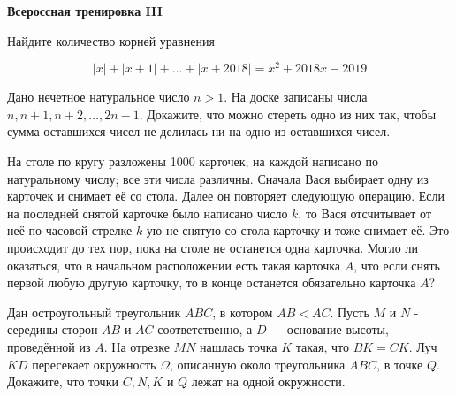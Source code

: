 \centerline{\bf \Huge Всероссная тренировка III}

\begin{flushright}
        \scriptsize{}
\end{flushright}

Найдите количество корней уравнения

$$
|x|+|x+1|+\ldots+|x+2018|=x^2+2018 x-2019
$$


Дано нечетное натуральное число $n>1$. На доске записаны числа $n, n+1, n+2, \ldots, 2 n-1$. Докажите, что можно стереть одно из них так, чтобы сумма оставшихся чисел не делилась ни на одно из оставшихся чисел.

На столе по кругу разложены 1000 карточек, на каждой написано по натуральному числу; все эти числа различны. Сначала Вася выбирает одну из карточек и снимает её со стола. Далее он повторяет следующую операцию. Если на последней снятой карточке было написано число $k$, то Вася отсчитывает от неё по часовой стрелке $k$-ую не снятую со стола карточку и тоже снимает её. Это происходит до тех пор, пока на столе не останется одна карточка. Могло ли оказаться, что в начальном расположении есть такая карточка $A$, что если снять первой любую другую карточку, то в конце останется обязательно карточка $A$?

Дан остроугольный треугольник $A B C$, в котором $A B<A C$. Пусть $M$ и $N$ - середины сторон $A B$ и $A C$ соответственно, а $D$ --- основание высоты, проведённой из $A$. На отрезке $M N$ нашлась точка $K$ такая, что $B K=C K$. Луч $K D$ пересекает окружность $\Omega$, описанную около треугольника $A B C$, в точке $Q$. Докажите, что точки $C, N, K$ и $Q$ лежат на одной окружности.